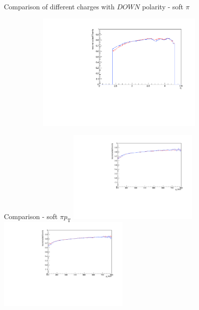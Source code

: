 \documentclass[11pt]{beamer}
\begin{document}
\begin{frame}{Comparison of different charges with $DOWN$ polarity - soft $\pi$}
\begin{figure}
\begin{subfigure}{0.45\textwidth}
\end{subfigure}
\begin{subfigure}{0.45\textwidth}
\includegraphics[width=0.9\textwidth]{first/down_pdf/combined/h_eta_reco_SPi.pdf}
\end{subfigure}
\end{figure}
\end{frame}
\begin{frame}{Comparison - soft $\pi p_\text{T}$}
\centering
\includegraphics[width=0.48\textwidth]{first/up_pdf/combined/h_pt_reco_SPi.pdf}
\includegraphics[width=0.48\textwidth]{first/down_pdf/combined/h_pt_reco_SPi.pdf}
\end{frame}
\end{document}
